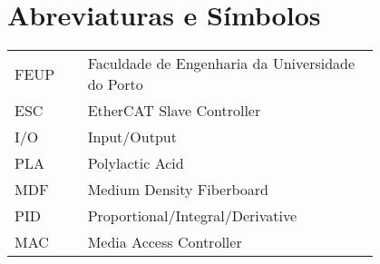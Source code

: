 \chapter*{Abreviaturas e Símbolos}

\begin{flushleft}
\begin{tabular}{l p{0.8\linewidth}}
FEUP     & Faculdade de Engenharia da Universidade do Porto\\
ESC      & EtherCAT Slave Controller\\
I/O      & Input/Output\\
PLA      & Polylactic Acid\\
MDF      & Medium Density Fiberboard\\
PID      & Proportional/Integral/Derivative\\
MAC      & Media Access Controller\\
\end{tabular}
\end{flushleft}

